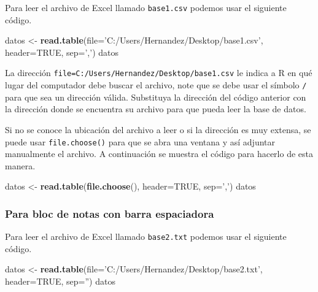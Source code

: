 \documentclass[10pt,]{krantz}
\makeatletter
\newenvironment{Shaded}{\begin{snugshade}}{\end{snugshade}}
\newcommand{\KeywordTok}[1]{\textcolor[rgb]{0.13,0.29,0.53}{\textbf{{#1}}}}
\newcommand{\DataTypeTok}[1]{\textcolor[rgb]{0.13,0.29,0.53}{{#1}}}
\newcommand{\StringTok}[1]{\textcolor[rgb]{0.31,0.60,0.02}{{#1}}}
\newcommand{\OtherTok}[1]{\textcolor[rgb]{0.56,0.35,0.01}{{#1}}}
\newcommand{\NormalTok}[1]{{#1}}
\let\proglang=\textsf
\newenvironment{kframe}{%
\medskip{}
\setlength{\fboxsep}{.8em}
 \def\at@end@of@kframe{}%
 \ifinner\ifhmode%
  \def\at@end@of@kframe{\end{minipage}}%
  \begin{minipage}{\columnwidth}%
 \fi\fi%
 \def\FrameCommand##1{\hskip\@totalleftmargin \hskip-\fboxsep
 \colorbox{shadecolor}{##1}\hskip-\fboxsep
     \hskip-\linewidth \hskip-\@totalleftmargin \hskip\columnwidth}%
 \MakeFramed {\advance\hsize-\width
   \@totalleftmargin\z@ \linewidth\hsize
   \@setminipage}}%
 {\par\unskip\endMakeFramed%
 \at@end@of@kframe}
\renewenvironment{Shaded}{\begin{kframe}}{\end{kframe}}
\makeatother
\begin{document}
Para leer el archivo de Excel llamado \texttt{base1.csv} podemos usar el
siguiente código.

\begin{Shaded}
\begin{Highlighting}[]
\NormalTok{datos <-}\StringTok{ }\KeywordTok{read.table}\NormalTok{(}\DataTypeTok{file=}\StringTok{'C:/Users/Hernandez/Desktop/base1.csv'}\NormalTok{,}
                    \DataTypeTok{header=}\OtherTok{TRUE}\NormalTok{, }\DataTypeTok{sep=}\StringTok{','}\NormalTok{)}
\NormalTok{datos}
\end{Highlighting}
\end{Shaded}

La dirección
\texttt{file=\textquotesingle{}C:/Users/Hernandez/Desktop/base1.csv\textquotesingle{}}
le indica a \proglang{R} en qué lugar del computador debe buscar el
archivo, note que se debe usar el símbolo \texttt{/} para que sea un
dirección válida. Substituya la dirección del código anterior con la
dirección donde se encuentra su archivo para que pueda leer la base de
datos.

Si no se conoce la ubicación del archivo a leer o si la dirección es muy
extensa, se puede usar \texttt{file.choose()} para que se abra una
ventana y así adjuntar manualmente el archivo. A continuación se muestra
el código para hacerlo de esta manera.

\begin{Shaded}
\begin{Highlighting}[]
\NormalTok{datos <-}\StringTok{ }\KeywordTok{read.table}\NormalTok{(}\KeywordTok{file.choose}\NormalTok{(), }\DataTypeTok{header=}\OtherTok{TRUE}\NormalTok{, }\DataTypeTok{sep=}\StringTok{','}\NormalTok{)}
\NormalTok{datos}
\end{Highlighting}
\end{Shaded}

\subsubsection*{Para bloc de notas con barra
espaciadora}\label{para-bloc-de-notas-con-barra-espaciadora}

Para leer el archivo de Excel llamado \texttt{base2.txt} podemos usar el
siguiente código.

\begin{Shaded}
\begin{Highlighting}[]
\NormalTok{datos <-}\StringTok{ }\KeywordTok{read.table}\NormalTok{(}\DataTypeTok{file=}\StringTok{'C:/Users/Hernandez/Desktop/base2.txt'}\NormalTok{,}
                    \DataTypeTok{header=}\OtherTok{TRUE}\NormalTok{, }\DataTypeTok{sep=}\StringTok{''}\NormalTok{)}
\NormalTok{datos}
\end{Highlighting}
\end{Shaded}
\end{document}
